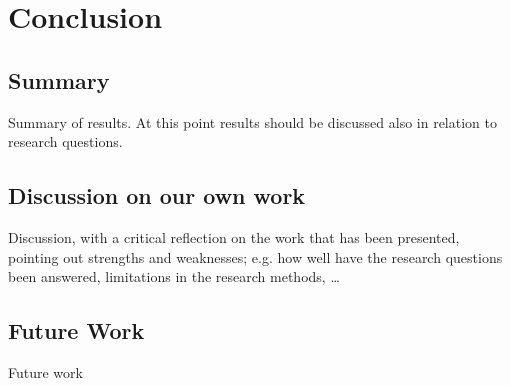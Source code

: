 \chapter{Conclusion}
\section{Summary}
Summary of results. At this point results should be discussed also in
relation to research questions.
\section{Discussion on our own work}
Discussion, with a critical reflection on the work that has been presented,
pointing out strengths and weaknesses; e.g. how well have the research questions been answered, limitations in the research methods, …
\section{Future Work}
Future work
